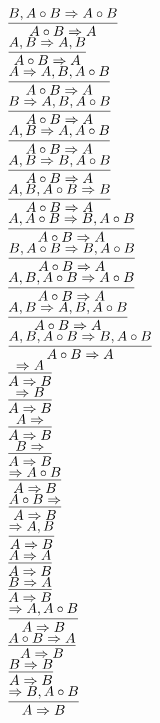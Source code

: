 \documentclass[11pt]{article}
\begin{document}
\begin{center}
\bigskip
\\$\infer{A\circ B\Rightarrow A}{B, A\circ B\Rightarrow A\circ B}$
\bigskip
\\$\infer{A\circ B\Rightarrow A}{A, B\Rightarrow A, B}$
\bigskip
\\$\infer{A\circ B\Rightarrow A}{A\Rightarrow A, B, A\circ B}$
\bigskip
\\$\infer{A\circ B\Rightarrow A}{B\Rightarrow A, B, A\circ B}$
\bigskip
\\$\infer{A\circ B\Rightarrow A}{A, B\Rightarrow A, A\circ B}$
\bigskip
\\$\infer{A\circ B\Rightarrow A}{A, B\Rightarrow B, A\circ B}$
\bigskip
\\$\infer{A\circ B\Rightarrow A}{A, B, A\circ B\Rightarrow B}$
\bigskip
\\$\infer{A\circ B\Rightarrow A}{A, A\circ B\Rightarrow B, A\circ B}$
\bigskip
\\$\infer{A\circ B\Rightarrow A}{B, A\circ B\Rightarrow B, A\circ B}$
\bigskip
\\$\infer{A\circ B\Rightarrow A}{A, B, A\circ B\Rightarrow A\circ B}$
\bigskip
\\$\infer{A\circ B\Rightarrow A}{A, B\Rightarrow A, B, A\circ B}$
\bigskip
\\$\infer{A\circ B\Rightarrow A}{A, B, A\circ B\Rightarrow B, A\circ B}$
\bigskip
\\$\infer{A\Rightarrow B}{\Rightarrow A}$
\bigskip
\\$\infer{A\Rightarrow B}{\Rightarrow B}$
\bigskip
\\$\infer{A\Rightarrow B}{A\Rightarrow }$
\bigskip
\\$\infer{A\Rightarrow B}{B\Rightarrow }$
\bigskip
\\$\infer{A\Rightarrow B}{\Rightarrow A\circ B}$
\bigskip
\\$\infer{A\Rightarrow B}{A\circ B\Rightarrow }$
\bigskip
\\$\infer{A\Rightarrow B}{\Rightarrow A, B}$
\bigskip
\\$\infer{A\Rightarrow B}{A\Rightarrow A}$
\bigskip
\\$\infer{A\Rightarrow B}{B\Rightarrow A}$
\bigskip
\\$\infer{A\Rightarrow B}{\Rightarrow A, A\circ B}$
\bigskip
\\$\infer{A\Rightarrow B}{A\circ B\Rightarrow A}$
\bigskip
\\$\infer{A\Rightarrow B}{B\Rightarrow B}$
\bigskip
\\$\infer{A\Rightarrow B}{\Rightarrow B, A\circ B}$

\end{center}
\end{document}
